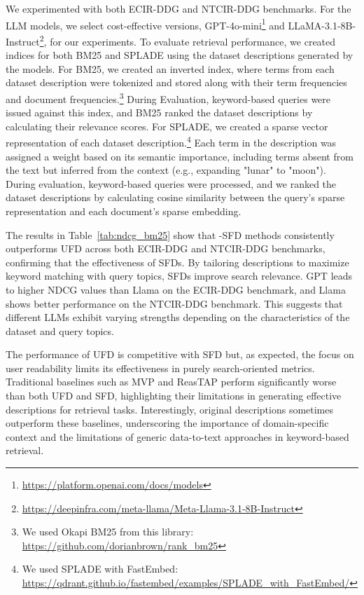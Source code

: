 We experimented with both ECIR-DDG and NTCIR-DDG benchmarks. For the LLM models, we select cost-effective versions, GPT-4o-mini\footnote{\url{https://platform.openai.com/docs/models}} and LLaMA-3.1-8B-Instruct\footnote{\url{https://deepinfra.com/meta-llama/Meta-Llama-3.1-8B-Instruct}}, for our experiments. 
% 
To evaluate retrieval performance, we created indices for both BM25 and SPLADE using the dataset descriptions generated by the models.
% 
For BM25, we created an inverted index, where terms from each dataset description were tokenized and stored along with their term frequencies and document frequencies.\footnote{We used Okapi BM25 from this library: \url{https://github.com/dorianbrown/rank_bm25}} During Evaluation, keyword-based queries were issued against this index, and BM25 ranked the dataset descriptions by calculating their relevance scores.
% 
For SPLADE, we created a sparse vector representation of each dataset description.\footnote{We used SPLADE with FastEmbed: \url{https://qdrant.github.io/fastembed/examples/SPLADE_with_FastEmbed/}} Each term in the description was assigned a weight based on its semantic importance, including terms absent from the text but inferred from the context (e.g., expanding "lunar" to "moon"). During evaluation, keyword-based queries were processed, and we ranked the dataset descriptions by calculating cosine similarity between the query's sparse representation and each document's sparse embedding.
% 

% 
The results in Table~\ref{tab:ndcg_bm25} show that \SystemName-SFD methods consistently outperforms UFD across both ECIR-DDG and NTCIR-DDG benchmarks, confirming that the effectiveness of SFDs.  By tailoring descriptions to maximize keyword matching with query topics, SFDs improve search relevance.
% 
GPT leads to higher NDCG values than Llama on the ECIR-DDG benchmark, and Llama shows better performance on the NTCIR-DDG benchmark. This suggests that different LLMs exhibit varying strengths depending on the characteristics of the dataset and query topics.
% 

The performance of UFD is competitive with SFD 
but, as expected, the focus on user readability limits its effectiveness in purely search-oriented metrics. 
% 
Traditional baselines such as MVP and ReasTAP perform significantly worse than both UFD and SFD, highlighting their limitations in generating effective descriptions for retrieval tasks. Interestingly, original descriptions sometimes outperform these baselines, underscoring the importance of domain-specific context and the limitations of generic data-to-text approaches in keyword-based retrieval.



